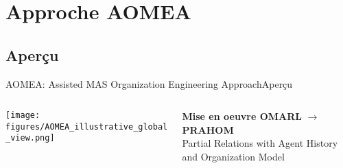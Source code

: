 

\section{Approche AOMEA}

\subsection{Aperçu}

\begin{frame}{AOMEA: Assisted MAS Organization Engineering Approach}{Aperçu}

    \begin{columns}

        \begin{column}{0.5\textwidth}

            \centering
            \vspace{-0.7ex}
            \texttt{[image: figures/AOMEA\_illustrative\_global\_view.png]}

        \end{column}

        \begin{column}{0.5\textwidth}
            {\small \textbf{Mise en oeuvre OMARL} $\rightarrow$ \textbf{PRAHOM} \\ { \footnotesize Partial Relations with Agent History and Organization Model}}


        \end{column}

    \end{columns}

\end{frame}




